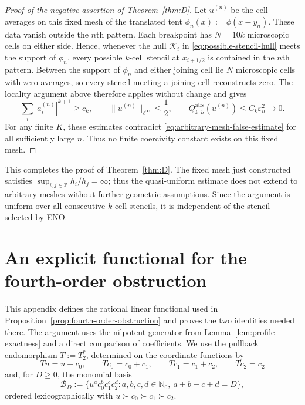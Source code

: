 \documentclass[11pt]{amsart}
\theoremstyle{plain}
\theoremstyle{definition}
\theoremstyle{remark}
\numberwithin{equation}{section}
\theoremstyle{plain}
\begin{document}
\begin{proof}[Proof of the negative assertion of
	Theorem~\ref{thm:D}]
	Let $\bar u^{(n)}$ be the cell averages on this fixed mesh of the
	translated tent $\phi_n(x):=\phi(x-y_n)$.  These data vanish outside the
	$n$th pattern.  Each breakpoint has $N=10k$ microscopic cells on either
	side.
	Hence, whenever the hull $\mathcal K_i$ in
	\eqref{eq:possible-stencil-hull} meets the support of $\phi_n$, every
	possible $k$-cell stencil at $x_{i+1/2}$ is contained in the $n$th pattern.
	Between the support of $\phi_n$ and either joining cell lie $N$ microscopic
	cells with zero averages, so every stencil meeting a joining cell
	reconstructs zero.  The locality argument above therefore applies without change and
	gives
	\[
	\sum_i|a_i^{(n)}|^{k+1}\ge c_k,\qquad
	\|\bar u^{(n)}\|_{\ell^\infty}\le\frac12,\qquad
	Q_{k,h}^{\mathrm{abs}}(\bar u^{(n)})
	\le C_k\varepsilon_n^2\longrightarrow0.
	\]
	For any finite $K$, these estimates contradict
	\eqref{eq:arbitrary-mesh-false-estimate} for all sufficiently large $n$.
	Thus no finite coercivity constant exists on this fixed mesh.
\end{proof}

This completes the proof of Theorem~\ref{thm:D}.  The fixed mesh just
constructed satisfies $\sup_{i,j\in\mathbb Z}h_i/h_j=\infty$; thus the
quasi-uniform estimate does not extend to arbitrary meshes without further
geometric assumptions.  Since the argument is uniform over all consecutive
$k$-cell stencils, it is independent of the stencil selected by ENO.


\appendix

\section{\texorpdfstring{An explicit functional for the fourth-order obstruction}{An explicit functional for the fourth-order obstruction}}
\label{app:fourth-order-functional}

This appendix defines the rational linear functional used in
Proposition~\ref{prop:fourth-order-obstruction} and proves the two identities
needed there.  The argument uses the nilpotent generator from
Lemma~\ref{lem:profile-exactness} and a direct comparison of coefficients.
We use the pullback endomorphism $T:=T_2^*$, determined on the coordinate
functions by
\begin{equation}\label{eq:appA-shift}
	Tu=u+c_0,\qquad
	Tc_0=c_0+c_1,\qquad
	Tc_1=c_1+c_2,\qquad
	Tc_2=c_2
\end{equation}
and, for $D\ge0$, the monomial basis
\begin{equation}\label{eq:appA-basis}
	\mathcal B_D
	:=\{u^ac_0^bc_1^cc_2^d:a,b,c,d\in\mathbb N_0,
	\ a+b+c+d=D\},
\end{equation}
ordered lexicographically with $u\succ c_0\succ c_1\succ c_2$.
\end{document}
